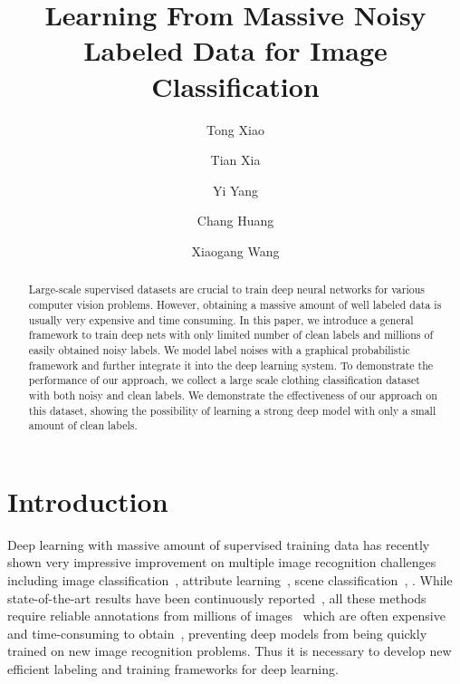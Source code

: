 \documentclass[10pt,twocolumn,letterpaper]{article}
\begin{document}

\title{Learning From Massive Noisy Labeled Data for Image Classification}

\author[1]{Tong Xiao}
\author[2]{Tian Xia}
\author[2]{Yi Yang}
\author[2]{Chang Huang}
\author[1]{Xiaogang Wang}


\renewcommand\Authands{ and }


\maketitle

\begin{abstract}
Large-scale supervised datasets are crucial to train deep neural networks for various computer vision problems. However, obtaining a massive amount of well labeled data is usually very expensive and time consuming. In this paper, we introduce a general framework to train deep nets with only limited number of clean labels and millions of easily obtained noisy labels. We model label noises with a graphical probabilistic framework and further integrate it into the deep learning system. To demonstrate the performance of our approach, we collect a large scale clothing classification dataset with both noisy and clean labels. We demonstrate the effectiveness of our approach on this dataset, showing the possibility of learning a strong deep model with only a small amount of clean labels.
\end{abstract}

\section{Introduction} %
\label{sec:introduction}

Deep learning with massive amount of supervised training data has recently shown very impressive improvement on multiple image recognition challenges including image classification~\cite{krizhevsky2012imagenet}, attribute learning~\cite{zhang2013panda}, scene classification~\cite{farabet2013learning}, \etc. While state-of-the-art results have been continuously reported~\cite{zeiler2013visualizing,simonyan2014very,szegedy2014going}, all these methods require reliable annotations from millions of images~\cite{deng2009imagenet} which are often expensive and time-consuming to obtain~\cite{deng2009imagenet}, preventing deep models from being quickly trained on new image recognition problems. Thus it is necessary to develop new efficient labeling and training frameworks for deep learning.
\end{document}

